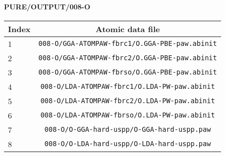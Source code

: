 \documentclass[onecolumn]{revtex4}
\begin{document}
\paragraph*{\bf{PURE/OUTPUT/008-O}}
\begin{center}
\begin{tabular}{lc}
\hline
Index & Atomic data file \\
\hline
1 & \verb?008-O/GGA-ATOMPAW-fbrc1/O.GGA-PBE-paw.abinit?\\
2 & \verb?008-O/GGA-ATOMPAW-fbrc2/O.GGA-PBE-paw.abinit?\\
3 & \verb?008-O/GGA-ATOMPAW-fbrso/O.GGA-PBE-paw.abinit?\\
4 & \verb?008-O/LDA-ATOMPAW-fbrc1/O.LDA-PW-paw.abinit?\\
5 & \verb?008-O/LDA-ATOMPAW-fbrc2/O.LDA-PW-paw.abinit?\\
6 & \verb?008-O/LDA-ATOMPAW-fbrso/O.LDA-PW-paw.abinit?\\
7 & \verb?008-O/O-GGA-hard-uspp/O-GGA-hard-uspp.paw?\\
8 & \verb?008-O/O-LDA-hard-uspp/O-LDA-hard-uspp.paw?\\
\hline
\end{tabular}
\end{center}
\end{document}
